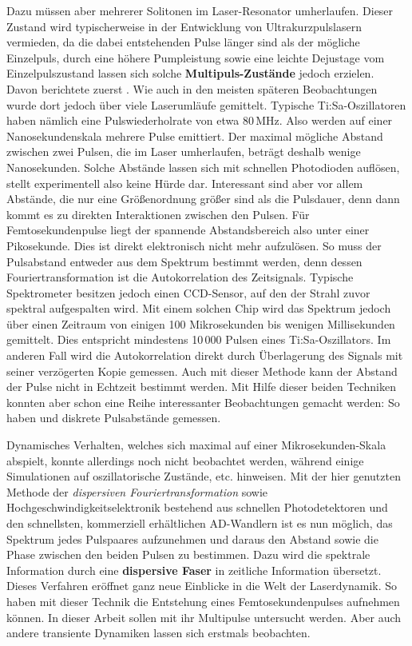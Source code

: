 \documentclass[bachelor,       %
               twoside,        %
               BCOR10mm,       %
               liststotoc,nomtotoc,bibtotoc, %
               english,ngerman, %
               final,          %
               ]{GAUBM}
\begin{document}
Dazu müssen aber mehrerer Solitonen im Laser-Resonator umherlaufen.
Dieser Zustand wird typischerweise in der Entwicklung von Ultrakurzpulslasern vermieden, da die dabei entstehenden Pulse länger sind als der mögliche Einzelpuls, durch eine höhere Pumpleistung sowie eine leichte Dejustage vom Einzelpulszustand lassen sich solche \textbf{Multipuls-Zustände} jedoch erzielen.
Davon berichtete zuerst \cite{lai_multiple_1997}.
Wie auch in den meisten späteren Beobachtungen wurde dort jedoch über viele Laserumläufe gemittelt.
Typische Ti:Sa-Oszillatoren haben nämlich eine Pulswiederholrate von etwa 80\,MHz.
Also werden auf einer Nanosekundenskala mehrere Pulse emittiert.
Der maximal mögliche Abstand zwischen zwei Pulsen, die im Laser umherlaufen, beträgt deshalb wenige Nanosekunden.
Solche Abstände lassen sich mit schnellen Photodioden auflösen, stellt experimentell also keine Hürde dar.
Interessant sind aber vor allem Abstände, die nur eine Größenordnung größer sind als die Pulsdauer, denn dann kommt es zu direkten Interaktionen zwischen den Pulsen.
Für Femtosekundenpulse liegt der spannende Abstandsbereich also unter einer Pikosekunde.
Dies ist direkt elektronisch nicht mehr aufzulösen.
So muss der Pulsabstand entweder aus dem Spektrum bestimmt werden, denn dessen Fouriertransformation ist die Autokorrelation des Zeitsignals.
Typische Spektrometer besitzen jedoch einen CCD-Sensor, auf den der Strahl zuvor spektral aufgespalten wird.
Mit einem solchen Chip wird das Spektrum jedoch über einen Zeitraum von einigen 100 Mikrosekunden bis wenigen Millisekunden gemittelt.
Dies entspricht mindestens 10\,000 Pulsen eines Ti:Sa-Oszillators.
Im anderen Fall wird die Autokorrelation direkt durch Überlagerung des Signals mit seiner verzögerten Kopie gemessen.
Auch mit dieser Methode kann der Abstand der Pulse nicht in Echtzeit bestimmt werden.
Mit Hilfe dieser beiden Techniken konnten aber schon eine Reihe interessanter Beobachtungen gemacht werden:
So haben \cite{wang_pulse_1997} und \cite{kitano_stable_1998} diskrete Pulsabstände  gemessen.

Dynamisches Verhalten, welches sich maximal auf einer Mikrosekunden-Skala abspielt, konnte allerdings noch nicht beobachtet werden, während einige Simulationen auf oszillatorische Zustände, etc. hinweisen.
Mit der hier genutzten Methode der \textit{dispersiven Fouriertransformation} sowie Hochgeschwindigkeitselektronik bestehend aus schnellen Photodetektoren und den schnellsten, kommerziell erhältlichen AD-Wandlern ist es nun möglich, das Spektrum jedes Pulspaares aufzunehmen und daraus den Abstand sowie die Phase zwischen den beiden Pulsen zu bestimmen.
Dazu wird die spektrale Information durch eine \textbf{dispersive Faser} in zeitliche Information übersetzt.
Dieses Verfahren eröffnet ganz neue Einblicke in die Welt der Laserdynamik.
So haben \cite{herink_resolving_2016} mit dieser Technik die Entstehung eines Femtosekundenpulses aufnehmen können.
In dieser Arbeit sollen mit ihr Multipulse untersucht werden.
Aber auch andere transiente Dynamiken lassen sich erstmals beobachten.
\end{document}
